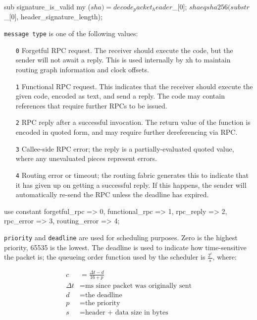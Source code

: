\documentclass{report}
\begin{document}
\begin{perlcode}
\begin{perlcode}
sub signature_is_valid {
  my ($sha) = decode_packet_header $_[0];
  $sha eq sha256(substr $_[0], header_signature_length);
} \end{perlcode}

    {\tt message type} is one of the following values:

\begin{enumerate}
\item[\tt 0]
  Forgetful RPC request. The receiver should execute the code, but the
  sender will not await a reply. This is used internally by xh to
  maintain routing graph information and clock offsets.

\item[\tt 1]
  Functional RPC request. This indicates that the receiver should execute
  the given code, encoded as text, and send a reply. The code may contain
  references that require further RPCs to be issued.

\item[\tt 2]
  RPC reply after a successful invocation. The return value of the
  function is encoded in quoted form, and may require further
  dereferencing via RPC.

\item[\tt 3]
  Callee-side RPC error; the reply is a partially-evaluated quoted value,
  where any unevaluated pieces represent errors.

\item[\tt 4]
  Routing error or timeout; the routing fabric generates this to indicate
  that it has given up on getting a successful reply. If this happens,
  the sender will automatically re-send the RPC unless the deadline has
  expired.
\end{enumerate}

\begin{perlcode}
use constant {forgetful_rpc  => 0,
              functional_rpc => 1,
              rpc_reply      => 2,
              rpc_error      => 3,
              routing_error  => 4}; \end{perlcode}

    {\tt priority} and {\tt deadline} are used for scheduling purposes. Zero is
    the highest priority, 65535 is the lowest. The deadline is used to indicate
    how time-sensitive the packet is; the queueing order function used by the
    scheduler is $\frac{2^c}{s}$, where:

\begin{align*}
c & = \frac{\Delta t - d}{16 + p} \\
\Delta t & = \textrm{ms since packet was originally sent} \\
d & = \textrm{the deadline} \\
p & = \textrm{the priority} \\
s & = \textrm{header + data size in bytes}
\end{align*}


\end{perlcode}
\end{document}
